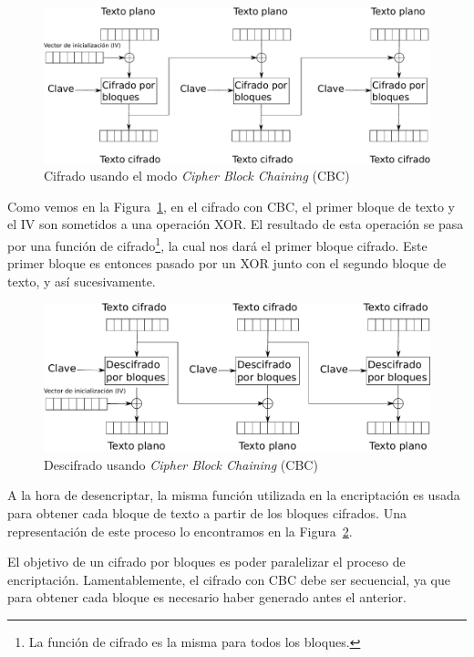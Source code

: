 \begin{figure}[ht]
  \centering
  \includegraphics[scale=0.5]{Figures/CBC_enc}
  \decoRule
  \caption[\emph{Cipher Block Chaining} (CBC) - Cifrado]{Cifrado usando el modo \emph{Cipher Block Chaining} (CBC)}
  \label{fig:CBC_enc}
\end{figure}

Como vemos en la Figura~\ref{fig:CBC_enc}, en el cifrado con CBC, el primer bloque de texto y el IV son sometidos a una operación XOR. El resultado de esta operación se pasa por una función de cifrado\footnote{La función de cifrado es la misma para todos los bloques.}, la cual nos dará el primer bloque cifrado. Este primer bloque es entonces pasado por un XOR junto con el segundo bloque de texto, y así sucesivamente.

\begin{figure}[ht]
  \centering
  \includegraphics[scale=0.5]{Figures/CBC_dec}
  \decoRule
  \caption[\emph{Cipher Block Chaining} (CBC) - Descifrado]{Descifrado usando \emph{Cipher Block Chaining} (CBC)}
  \label{fig:CBC_dec}
\end{figure}

A la hora de desencriptar, la misma función utilizada en la encriptación es usada para obtener cada bloque de texto a partir de los bloques cifrados. Una representación de este proceso lo encontramos en la Figura~\ref{fig:CBC_dec}.

El objetivo de un cifrado por bloques es poder paralelizar el proceso de encriptación. Lamentablemente, el cifrado con CBC debe ser secuencial, ya que para obtener cada bloque es necesario haber generado antes el anterior.

